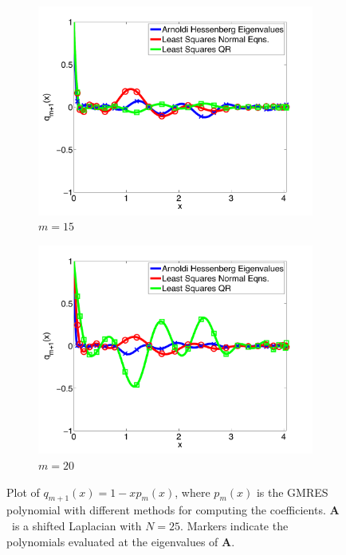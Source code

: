 \documentclass[10pt]{article}
\newcommand{\bA}{\ensuremath{\mathbf{A}}}
\begin{document}
\begin{figure}
\begin{subfigure}[b]{0.49\linewidth}
\includegraphics[width=\textwidth]{gmres_poly15}
\caption{$m = 15$}
\end{subfigure}
\begin{subfigure}[b]{0.49\linewidth}
\includegraphics[width=\textwidth]{gmres_poly20}
\caption{$m = 20$}
\end{subfigure}
\caption{Plot of $q_{m+1}(x)=1-xp_{m}(x)$, where $p_m(x)$ is the GMRES
 polynomial with different methods for computing the coefficients.
 \bA\ is a shifted Laplacian with $N=25$.  Markers
 indicate the polynomials evaluated at the eigenvalues of \bA.}
\label{fig:gmres_poly}
\end{figure}
\end{document}
